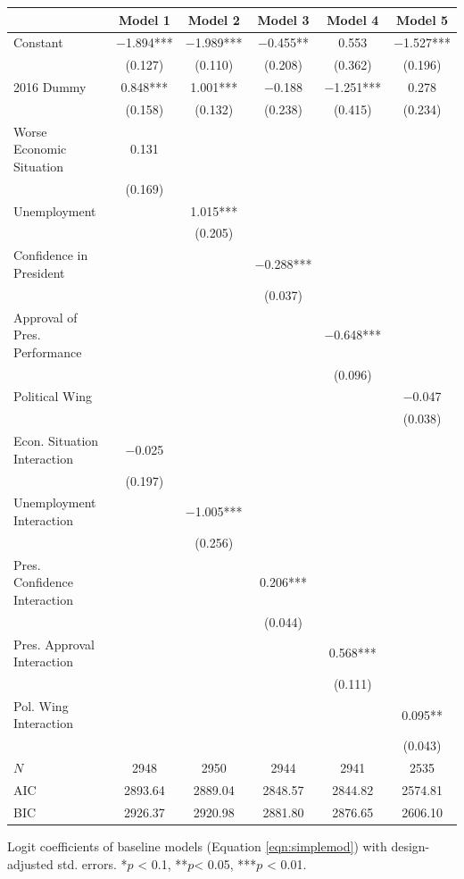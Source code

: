 \documentclass[12pt,a4]{article}\usepackage[]{graphicx}\usepackage[]{xcolor}
\begin{document}
\begin{table}[htbp!]
\begin{tabular}[t]{lccccc}
\toprule
  & Model 1 & Model 2 & Model 3 & Model 4 & Model 5\\
\midrule
Constant & \num{-1.894}*** & \num{-1.989}*** & \num{-0.455}** & \num{0.553} & \num{-1.527}***\\
 & (\num{0.127}) & (\num{0.110}) & (\num{0.208}) & (\num{0.362}) & (\num{0.196})\\
2016 Dummy & \num{0.848}*** & \num{1.001}*** & \num{-0.188} & \num{-1.251}*** & \num{0.278}\\
 & (\num{0.158}) & (\num{0.132}) & (\num{0.238}) & (\num{0.415}) & (\num{0.234})\\
Worse Economic Situation & \num{0.131} &  &  &  & \\
 & (\num{0.169}) &  &  &  & \\
Unemployment &  & \num{1.015}*** &  &  & \\
 &  & (\num{0.205}) &  &  & \\
Confidence in President &  &  & \num{-0.288}*** &  & \\
 &  &  & (\num{0.037}) &  & \\
Approval of Pres. Performance &  &  &  & \num{-0.648}*** & \\
 &  &  &  & (\num{0.096}) & \\
Political Wing &  &  &  &  & \num{-0.047}\\
 &  &  &  &  & (\num{0.038})\\
Econ. Situation Interaction & \num{-0.025} &  &  &  & \\
 & (\num{0.197}) &  &  &  & \\
Unemployment Interaction &  & \num{-1.005}*** &  &  & \\
 &  & (\num{0.256}) &  &  & \\
Pres. Confidence Interaction &  &  & \num{0.206}*** &  & \\
 &  &  & (\num{0.044}) &  & \\
Pres. Approval Interaction &  &  &  & \num{0.568}*** & \\
 &  &  &  & (\num{0.111}) & \\
Pol. Wing Interaction &  &  &  &  & \num{0.095}**\\
 &  &  &  &  & (\num{0.043})\\
\midrule
$N$ & \num{2948} & \num{2950} & \num{2944} & \num{2941} & \num{2535}\\
AIC & \num{2893.64} & \num{2889.04} & \num{2848.57} & \num{2844.82} & \num{2574.81}\\
BIC & \num{2926.37} & \num{2920.98} & \num{2881.80} & \num{2876.65} & \num{2606.10}\\
\bottomrule
\end{tabular}


\vspace{0.15cm}
Logit coefficients of baseline models (Equation \ref{eqn:simplemod}) with design-adjusted std. errors. *$p$ < 0.1, **$p$< 0.05, ***$p$ < 0.01.
\end{table}
\end{document}
